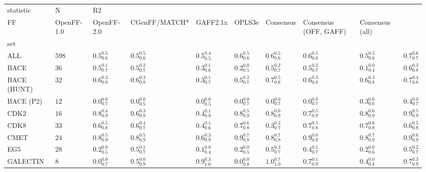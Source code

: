 \begin{tabular}{llllllllll}
\toprule
statistic &      N & \multicolumn{8}{l}{R2} \\
FF &         OpenFF-1.0 &         OpenFF-2.0 &      CGenFF/MATCH* &           GAFF2.1x &             OPLS3e &          Consensus & Consensus (OFF, GAFF) &    Consensus (all) \\
set         &        &                    &                    &                    &                    &                    &                    &                       &                    \\
\midrule
ALL         &  $598$ &  $0.5^{0.5}_{0.6}$ &  $0.5^{0.5}_{0.6}$ &  $0.5^{0.4}_{0.5}$ &  $0.6^{0.5}_{0.6}$ &  $0.6^{0.5}_{0.6}$ &  $0.6^{0.5}_{0.6}$ &     $0.5^{0.5}_{0.6}$ &  $0.7^{0.6}_{0.7}$ \\
BACE        &   $36$ &  $0.5^{0.1}_{0.7}$ &  $0.5^{0.2}_{0.7}$ &  $0.3^{0.1}_{0.6}$ &  $0.2^{0.0}_{0.5}$ &  $0.5^{0.2}_{0.7}$ &  $0.5^{0.2}_{0.7}$ &     $0.1^{0.0}_{0.4}$ &  $0.6^{0.3}_{0.8}$ \\
BACE (HUNT) &   $32$ &  $0.6^{0.3}_{0.8}$ &  $0.6^{0.3}_{0.8}$ &  $0.3^{0.1}_{0.7}$ &  $0.5^{0.2}_{0.7}$ &  $0.7^{0.5}_{0.8}$ &  $0.6^{0.3}_{0.8}$ &     $0.6^{0.3}_{0.8}$ &  $0.7^{0.4}_{0.8}$ \\
BACE (P2)   &   $12$ &  $0.0^{0.0}_{0.7}$ &  $0.0^{0.0}_{0.5}$ &  $0.0^{0.0}_{0.5}$ &  $0.0^{0.0}_{0.7}$ &  $0.0^{0.0}_{0.7}$ &  $0.0^{0.0}_{0.7}$ &     $0.3^{0.0}_{0.6}$ &  $0.4^{0.0}_{0.7}$ \\
CDK2        &   $16$ &  $0.8^{0.4}_{0.9}$ &  $0.6^{0.3}_{0.9}$ &  $0.4^{0.1}_{0.8}$ &  $0.8^{0.5}_{0.9}$ &  $0.8^{0.6}_{0.9}$ &  $0.7^{0.5}_{0.9}$ &     $0.8^{0.6}_{0.9}$ &  $0.9^{0.5}_{0.9}$ \\
CDK8        &   $33$ &  $0.6^{0.5}_{0.8}$ &  $0.6^{0.4}_{0.7}$ &  $0.4^{0.1}_{0.6}$ &  $0.7^{0.6}_{0.8}$ &  $0.3^{0.2}_{0.7}$ &  $0.7^{0.5}_{0.8}$ &     $0.7^{0.6}_{0.8}$ &  $0.6^{0.5}_{0.8}$ \\
CMET        &   $24$ &  $0.8^{0.5}_{0.9}$ &  $0.8^{0.5}_{0.9}$ &  $0.6^{0.3}_{0.9}$ &  $0.9^{0.7}_{0.9}$ &  $0.8^{0.7}_{0.9}$ &  $0.9^{0.6}_{0.9}$ &     $0.8^{0.7}_{0.9}$ &  $0.9^{0.6}_{0.9}$ \\
EG5         &   $28$ &  $0.2^{0.0}_{0.5}$ &  $0.5^{0.1}_{0.7}$ &  $0.1^{0.0}_{0.4}$ &  $0.2^{0.0}_{0.5}$ &  $0.5^{0.3}_{0.7}$ &  $0.4^{0.1}_{0.7}$ &     $0.2^{0.0}_{0.6}$ &  $0.5^{0.2}_{0.7}$ \\
GALECTIN    &    $8$ &  $0.0^{0.0}_{0.7}$ &  $0.5^{0.0}_{0.9}$ &  $0.9^{0.3}_{1.0}$ &  $0.0^{0.0}_{0.8}$ &  $1.0^{0.7}_{1.0}$ &  $0.7^{0.1}_{0.9}$ &     $0.4^{0.0}_{0.8}$ &  $0.7^{0.3}_{0.9}$ \\

\end{tabular}
